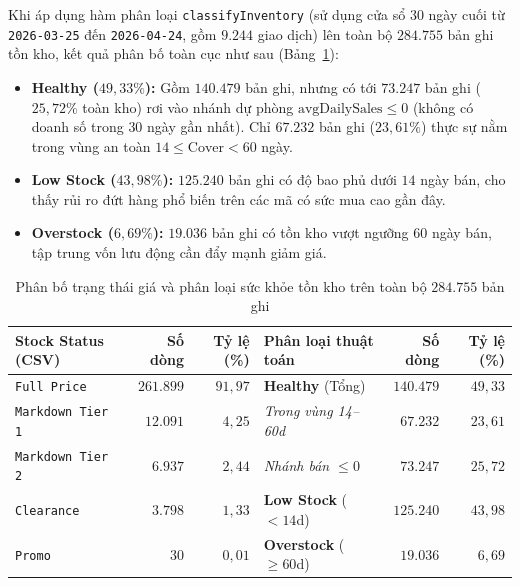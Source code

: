 \medskip

Khi áp dụng hàm phân loại \texttt{classifyInventory} (sử dụng cửa sổ $30$ ngày cuối từ \texttt{2026-03-25} đến \texttt{2026-04-24}, gồm $9.244$ giao dịch) lên toàn bộ $284.755$ bản ghi tồn kho, kết quả phân bố toàn cục như sau (Bảng~\ref{tab:eda-inv-health}):
\begin{itemize}[topsep=0pt, itemsep=1pt]
	\item \textbf{Healthy ($49{,}33\%$):} Gồm $140.479$ bản ghi, nhưng có tới $73.247$ bản ghi ($25{,}72\%$ toàn kho) rơi vào nhánh dự phòng $\text{avgDailySales} \le 0$ (không có doanh số trong $30$ ngày gần nhất). Chỉ $67.232$ bản ghi ($23{,}61\%$) thực sự nằm trong vùng an toàn $14 \le \text{Cover} < 60$ ngày.
	\item \textbf{Low Stock ($43{,}98\%$):} $125.240$ bản ghi có độ bao phủ dưới $14$ ngày bán, cho thấy rủi ro đứt hàng phổ biến trên các mã có sức mua cao gần đây.
	\item \textbf{Overstock ($6{,}69\%$):} $19.036$ bản ghi có tồn kho vượt ngưỡng $60$ ngày bán, tập trung vốn lưu động cần đẩy mạnh giảm giá.
\end{itemize}

\begin{table}[H]
	\centering
	\footnotesize
	\setlength{\tabcolsep}{4pt}
	\begin{tabular}{p{3.6cm} r r | p{4.6cm} r r}
		\toprule
		\textbf{Stock Status (CSV)}        & \textbf{Số dòng} & \textbf{Tỷ lệ (\%)} & \textbf{Phân loại thuật toán}     & \textbf{Số dòng} & \textbf{Tỷ lệ (\%)} \\
		\midrule
		\texttt{Full Price}      & $261.899$        & $91{,}97$           & \textbf{Healthy} (Tổng)           & $140.479$        & $49{,}33$           \\
		\texttt{Markdown Tier 1} & $12.091$         & $4{,}25$            & \quad \textit{Trong vùng 14--60d} & $67.232$         & $23{,}61$           \\
		\texttt{Markdown Tier 2} & $6.937$          & $2{,}44$            & \quad \textit{Nhánh bán $\le 0$}  & $73.247$         & $25{,}72$           \\
		\texttt{Clearance}       & $3.798$          & $1{,}33$            & \textbf{Low Stock} ($< 14$d)      & $125.240$        & $43{,}98$           \\
		\texttt{Promo}           & $30$             & $0{,}01$            & \textbf{Overstock} ($\ge 60$d)    & $19.036$         & $6{,}69$            \\
		\bottomrule
	\end{tabular}
	\caption{Phân bố trạng thái giá và phân loại sức khỏe tồn kho trên toàn bộ $284.755$ bản ghi}
	\label{tab:eda-inv-health}
\end{table}

